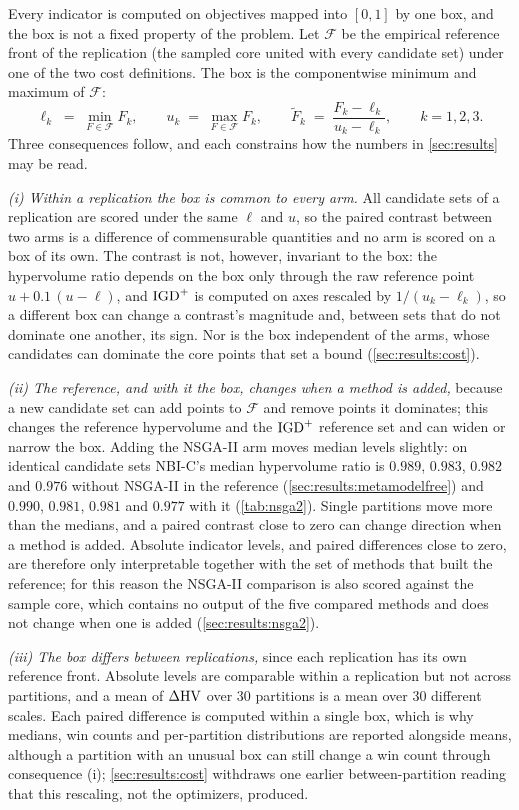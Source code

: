 Every indicator is computed on objectives mapped into $[0,1]$ by one box, and the box is not a fixed property of the
problem. Let $\mathcal{F}$ be the empirical reference front of the replication (the sampled core united with every
candidate set) under one of the two cost definitions. The box is the componentwise minimum and maximum of $\mathcal{F}$:
\begin{equation}
\ell_k \;=\; \min_{F \in \mathcal{F}} F_k, \qquad u_k \;=\; \max_{F \in \mathcal{F}} F_k, \qquad
\tilde F_k \;=\; \frac{F_k - \ell_k}{u_k - \ell_k}, \qquad k = 1,2,3 .
\label{eq:normbox}
\end{equation}
Three consequences follow, and each constrains how the numbers in \cref{sec:results} may be read.

\emph{(i) Within a replication the box is common to every arm.} All candidate sets of a replication are scored under
the same $\ell$ and $u$, so the paired contrast between two arms is a difference of commensurable quantities and no
arm is scored on a box of its own. The contrast is not, however, invariant to the box: the hypervolume ratio depends
on the box only through the raw reference point $u + 0.1\,(u-\ell)$, and $\mathrm{IGD}^{+}$ is computed on axes rescaled by
$1/(u_k-\ell_k)$, so a different box can change a contrast's magnitude and, between sets that do not dominate one
another, its sign. Nor is the box independent of the arms, whose candidates can dominate the core points that set a
bound (\cref{sec:results:cost}).

\emph{(ii) The reference, and with it the box, changes when a method is added,} because a new candidate set can add
points to $\mathcal{F}$ and remove points it dominates; this changes the reference hypervolume and the $\mathrm{IGD}^{+}$
reference set and can widen or narrow the box. Adding the NSGA-II arm moves median levels slightly: on identical
candidate sets NBI-C's median hypervolume ratio is $0.989$, $0.983$, $0.982$ and $0.976$ without NSGA-II in the
reference (\cref{sec:results:metamodelfree}) and $0.990$, $0.981$, $0.981$ and $0.977$ with it (\cref{tab:nsga2}).
Single partitions move more than the medians, and a paired contrast close to zero can change direction when a method
is added. Absolute indicator levels, and paired differences close to zero, are therefore only interpretable together
with the set of methods that built the reference; for this reason the NSGA-II comparison is also scored against the
sample core, which contains no output of the five compared methods and does not change when one is added
(\cref{sec:results:nsga2}).

\emph{(iii) The box differs between replications,} since each replication has its own reference front. Absolute
levels are comparable within a replication but not across partitions, and a mean of $\Delta\mathrm{HV}$ over 30 partitions is
a mean over 30 different scales. Each paired difference is computed within a single box, which is why medians, win
counts and per-partition distributions are reported alongside means, although a partition with an unusual box can
still change a win count through consequence (i); \cref{sec:results:cost} withdraws one earlier between-partition
reading that this rescaling, not the optimizers, produced.
